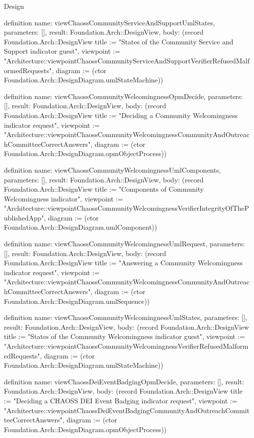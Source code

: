 \begin{lexlean}{Design}
\begin{semanticmodule}
definition{
  name: viewChaossCommunityServiceAndSupportUmlStates,
  parameters: [],
  result: Foundation.Arch::DesignView,
  body: (record Foundation.Arch::DesignView {title := "States of the Community Service and Support indicator guest", viewpoint := "Architecture::viewpointChaossCommunityServiceAndSupportVerifierRefusedMalformedRequests", diagram := (ctor Foundation.Arch::DesignDiagram.umlStateMachine)})
}

definition{
  name: viewChaossCommunityWelcomingnessOpmDecide,
  parameters: [],
  result: Foundation.Arch::DesignView,
  body: (record Foundation.Arch::DesignView {title := "Deciding a Community Welcomingness indicator request", viewpoint := "Architecture::viewpointChaossCommunityWelcomingnessCommunityAndOutreachCommitteeCorrectAnswers", diagram := (ctor Foundation.Arch::DesignDiagram.opmObjectProcess)})
}

definition{
  name: viewChaossCommunityWelcomingnessUmlComponents,
  parameters: [],
  result: Foundation.Arch::DesignView,
  body: (record Foundation.Arch::DesignView {title := "Components of Community Welcomingness indicator", viewpoint := "Architecture::viewpointChaossCommunityWelcomingnessVerifierIntegrityOfThePublishedApp", diagram := (ctor Foundation.Arch::DesignDiagram.umlComponent)})
}

definition{
  name: viewChaossCommunityWelcomingnessUmlRequest,
  parameters: [],
  result: Foundation.Arch::DesignView,
  body: (record Foundation.Arch::DesignView {title := "Answering a Community Welcomingness indicator request", viewpoint := "Architecture::viewpointChaossCommunityWelcomingnessCommunityAndOutreachCommitteeCorrectAnswers", diagram := (ctor Foundation.Arch::DesignDiagram.umlSequence)})
}

definition{
  name: viewChaossCommunityWelcomingnessUmlStates,
  parameters: [],
  result: Foundation.Arch::DesignView,
  body: (record Foundation.Arch::DesignView {title := "States of the Community Welcomingness indicator guest", viewpoint := "Architecture::viewpointChaossCommunityWelcomingnessVerifierRefusedMalformedRequests", diagram := (ctor Foundation.Arch::DesignDiagram.umlStateMachine)})
}

definition{
  name: viewChaossDeiEventBadgingOpmDecide,
  parameters: [],
  result: Foundation.Arch::DesignView,
  body: (record Foundation.Arch::DesignView {title := "Deciding a CHAOSS DEI Event Badging indicator request", viewpoint := "Architecture::viewpointChaossDeiEventBadgingCommunityAndOutreachCommitteeCorrectAnswers", diagram := (ctor Foundation.Arch::DesignDiagram.opmObjectProcess)})
}


\end{semanticmodule}
\end{lexlean}
